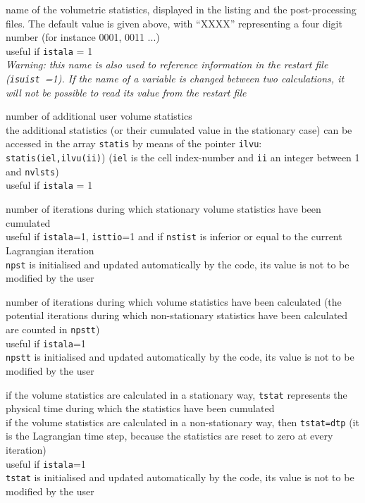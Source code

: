 {name of the volumetric statistics, displayed in the listing
and the post-processing files. The default value is given above, with ``XXXX''
representing a four digit number (for instance 0001, 0011 ...)\\
useful if \texttt{istala} = 1\\
{\em Warning: this name is also used to reference information in the restart file
\mbox{(\texttt{isuist} =1)}. If the name of a variable is changed between two
calculations, it will not be possible to read its value from the restart file}}

{number of additional user volume statistics\\
the additional statistics (or their cumulated value in the stationary
case) can be accessed in the array \texttt{statis} by means of the pointer
\texttt{ilvu}: \texttt{statis(iel,ilvu(ii)})
(\texttt{iel} is the cell index-number and \texttt{ii} an integer between
1 and \texttt{nvlsts})\\
useful if \texttt{istala} = 1}

{number of iterations during which stationary volume statistics have
been cumulated\\
useful if \texttt{istala}=1, \texttt{isttio}=1 and if \texttt{nstist} is
inferior or equal to the current Lagrangian iteration\\
\texttt{npst} is initialised and updated automatically by the code, its
value is not to be modified by the user}

{number of iterations during which volume statistics have been
calculated (the potential iterations during which non-stationary
statistics have been calculated are counted in \texttt{npstt})\\
useful if \texttt{istala}=1\\
\texttt{npstt} is initialised and updated automatically by the code,
its value is not to be modified by the user}

{if the volume statistics are calculated in a stationary way, \texttt{tstat}
represents the physical time during which the statistics have been cumulated\\
if the volume statistics are calculated in a non-stationary way,
then \texttt{tstat=dtp} (it is the Lagrangian time step, because the
statistics are reset to zero at every iteration)\\
useful if \texttt{istala}=1\\
\texttt{tstat} is initialised and updated automatically by the code,
its value is not to be modified by the user}


